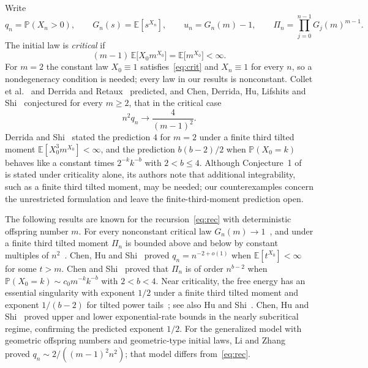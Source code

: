 \documentclass[11pt]{amsart}
\theoremstyle{remark}
\numberwithin{equation}{section}
\newcommand{\PP}{\mathbb{P}}
\newcommand{\EE}{\mathbb{E}}
\begin{document}
Write
\[
q_n=\PP(X_n>0),\qquad G_n(s)=\EE[s^{X_n}],\qquad u_n=G_n(m)-1,\qquad \Pi_n=\prod_{j=0}^{n-1}G_j(m)^{m-1}.
\]
The initial law is \emph{critical} if
\begin{equation}\label{eq:crit}
(m-1)\,\EE\bigl[X_0m^{X_0}\bigr]=\EE\bigl[m^{X_0}\bigr]<\infty .
\end{equation}
For $m=2$ the constant law $X_0\equiv1$ satisfies~\eqref{eq:crit} and $X_n\equiv1$ for every $n$, so a nondegeneracy condition is needed; every law in our results is nonconstant. Collet et al.~\cite{CEGM} and Derrida and Retaux~\cite{DR} predicted, and Chen, Derrida, Hu, Lifshits and Shi~\cite[Conjecture~1]{CDHLS} conjectured for every $m\ge2$, that in the critical case
\begin{equation}\label{eq:conj}
n^2q_n\to\frac{4}{(m-1)^2}.
\end{equation}
Derrida and Shi~\cite[Section~2.1, equations~(13)--(14)]{DS} stated the prediction $4$ for $m=2$ under a finite third tilted moment $\EE[X_0^3m^{X_0}]<\infty$, and the prediction $b(b-2)/2$ when $\PP(X_0=k)$ behaves like a constant times $2^{-k}k^{-b}$ with $2<b\le4$. Although Conjecture~1 of~\cite{CDHLS} is stated under criticality alone, its authors note that additional integrability, such as a finite third tilted moment, may be needed; our counterexamples concern the unrestricted formulation and leave the finite-third-moment prediction open.

The following results are known for the recursion~\eqref{eq:rec} with deterministic offspring number $m$. For every nonconstant critical law $G_n(m)\to1$~\cite[Theorem~2]{CDHLS}, and under a finite third tilted moment $\Pi_n$ is bounded above and below by constant multiples of $n^2$~\cite[Propositions~1 and~2]{CDHLS}. Chen, Hu and Shi~\cite[Theorem~1.2]{CHS22} proved $q_n=n^{-2+o(1)}$ when $\EE[t^{X_0}]<\infty$ for some $t>m$. Chen and Shi~\cite[Theorem~1.1]{CS} proved that $\Pi_n$ is of order $n^{b-2}$ when $\PP(X_0=k)\sim c_0m^{-k}k^{-b}$ with $2<b<4$. Near criticality, the free energy has an essential singularity with exponent $1/2$ under a finite third tilted moment and exponent $1/(b-2)$ for tilted power tails~\cite[Theorems~1.1 and~1.2]{CDDHLS}; see also Hu and Shi~\cite{HS}. Chen, Hu and Shi~\cite{CHS24} proved upper and lower exponential-rate bounds in the nearly subcritical regime, confirming the predicted exponent $1/2$. For the generalized model with geometric offspring numbers and geometric-type initial laws, Li and Zhang~\cite[Theorem~1.3]{LZ} proved $q_n\sim2/((m-1)^2n^2)$; that model differs from~\eqref{eq:rec}.
\end{document}

